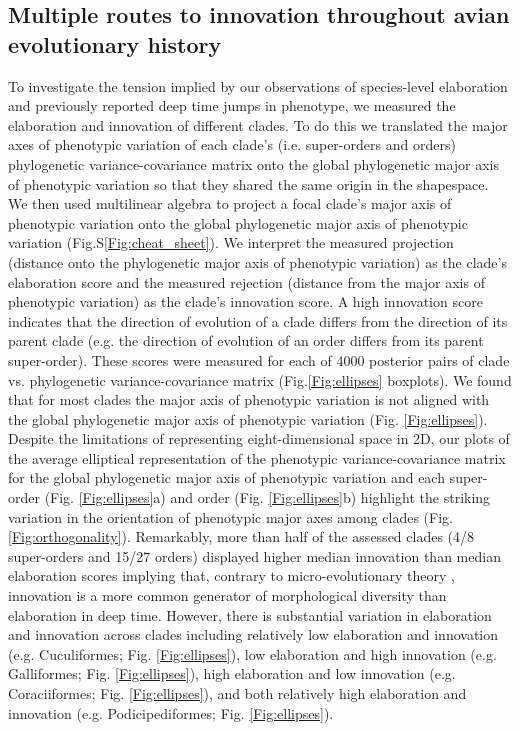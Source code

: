 \documentclass[12pt,letterpaper]{article}
\begin{document}
\subsection{Multiple routes to innovation throughout avian evolutionary history}

To investigate the tension implied by our observations of species-level elaboration and previously reported deep time jumps in phenotype, we measured the elaboration and innovation of different clades.
To do this we translated the major axes of phenotypic variation of each clade's (i.e. super-orders and orders) phylogenetic variance-covariance matrix onto the global phylogenetic major axis of phenotypic variation so that they shared the same origin in the shapespace.
We then used multilinear algebra to project a focal clade's major axis of phenotypic variation onto the global phylogenetic major axis of phenotypic variation (Fig.S\ref{Fig:cheat_sheet}).
We interpret the measured projection (distance onto the phylogenetic major axis of phenotypic variation) as the clade's elaboration score and the measured rejection (distance from the major axis of phenotypic variation) as the clade's innovation score.
A high innovation score indicates that the direction of evolution of a clade differs from the direction of its parent clade (e.g. the direction of evolution of an order differs from its parent super-order).
These scores were measured for each of 4000 posterior pairs of clade vs. phylogenetic variance-covariance matrix (Fig.\ref{Fig:ellipses} boxplots).
We found that for most clades the major axis of phenotypic variation is not aligned with the global phylogenetic major axis of phenotypic variation (Fig. \ref{Fig:ellipses}). 
Despite the limitations of representing eight-dimensional space in 2D, our plots of the average elliptical representation of the phenotypic variance-covariance matrix for the global phylogenetic major axis of phenotypic variation and each super-order (Fig. \ref{Fig:ellipses}a) and order (Fig. \ref{Fig:ellipses}b) highlight the striking variation in the orientation of phenotypic major axes among clades (Fig. \ref{Fig:orthogonality}).
Remarkably, more than half of the assessed clades (4/8 super-orders and 15/27 orders) displayed higher median innovation than median elaboration scores implying that, contrary to micro-evolutionary theory \cite{schluter1996adaptive,marroig2005size}, innovation is a more common generator of morphological diversity than elaboration in deep time.
However, there is substantial variation in elaboration and innovation across clades including relatively low elaboration and innovation (e.g. Cuculiformes; Fig. \ref{Fig:ellipses}), low elaboration and high innovation (e.g. Galliformes; Fig. \ref{Fig:ellipses}), high elaboration and low innovation (e.g. Coraciiformes; Fig. \ref{Fig:ellipses}), and both relatively high elaboration and innovation (e.g. Podicipediformes; Fig. \ref{Fig:ellipses}).
\end{document}
